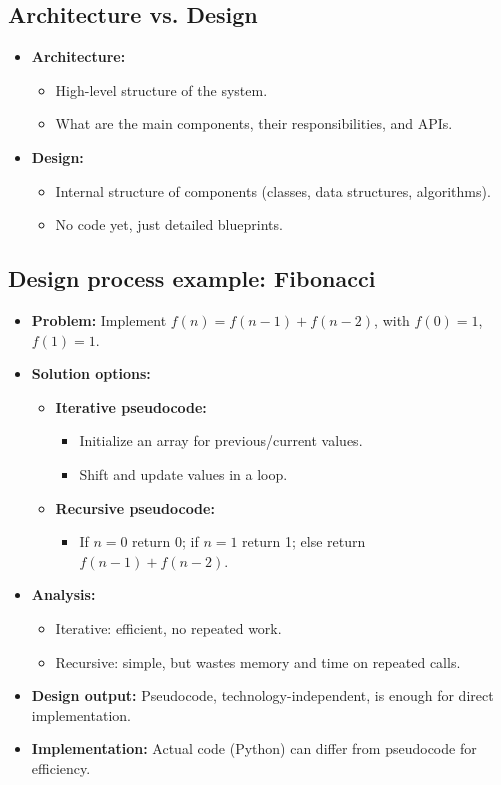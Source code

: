 \documentclass[11pt,a4paper]{article}
\begin{document}
\subsection*{Architecture vs. Design}
\begin{itemize}
    \item \textbf{Architecture:}
        \begin{itemize}
            \item High-level structure of the system.
            \item What are the main components, their responsibilities, and APIs.
        \end{itemize}
    \item \textbf{Design:}
        \begin{itemize}
            \item Internal structure of components (classes, data structures, algorithms).
            \item No code yet, just detailed blueprints.
        \end{itemize}
\end{itemize}

\subsection*{Design process example: Fibonacci}
\begin{itemize}
    \item \textbf{Problem:} Implement $f(n) = f(n-1) + f(n-2)$, with $f(0)=1$, $f(1)=1$.
    \item \textbf{Solution options:}
        \begin{itemize}
            \item \textbf{Iterative pseudocode:}
                \begin{itemize}
                    \item Initialize an array for previous/current values.
                    \item Shift and update values in a loop.
                \end{itemize}
            \item \textbf{Recursive pseudocode:}
                \begin{itemize}
                    \item If $n=0$ return 0; if $n=1$ return 1; else return $f(n-1) + f(n-2)$.
                \end{itemize}
        \end{itemize}
    \item \textbf{Analysis:}
        \begin{itemize}
            \item Iterative: efficient, no repeated work.
            \item Recursive: simple, but wastes memory and time on repeated calls.
        \end{itemize}
    \item \textbf{Design output:} Pseudocode, technology-independent, is enough for direct implementation.
    \item \textbf{Implementation:} Actual code (Python) can differ from pseudocode for efficiency.
\end{itemize}
\end{document}
